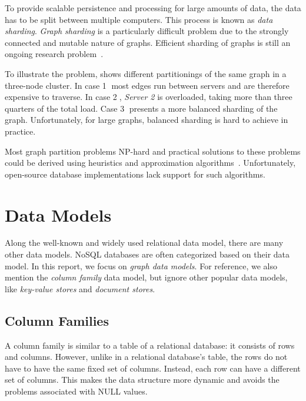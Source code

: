 To provide scalable persistence and processing for large amounts of data, the data has to be split between multiple computers. This process is known as \emph{data sharding}. \emph{Graph sharding} is a particularly difficult problem due to the strongly connected and mutable nature of graphs. Efficient sharding of graphs is still an ongoing research problem~\cite{ShardingGraph}.


To illustrate the problem,  shows different partitionings of the same graph in a three-node cluster. 
In case \textcircled{1} most edges run between servers and are therefore expensive to traverse.
In case \textcircled{2}, \emph{Server 2} is overloaded, taking more than three quarters of the total load.
Case \textcircled{3} presents a more balanced sharding of the graph.
Unfortunately, for large graphs, balanced sharding is hard to achieve in practice.

Most graph partition problems NP-hard and practical solutions to these problems could be derived using heuristics and approximation algorithms~\cite{conf/stacs/FeldmannF12}. Unfortunately, open-source database implementations lack support for such algorithms.

\section{Data Models}

Along the well-known and widely used relational data model, there are many other data models. NoSQL databases are often categorized based on their data model. In this report, we focus on \emph{graph data models}. For reference, we also mention the \emph{column family} data model, but ignore other popular data models, like \emph{key-value stores} and \emph{document stores}.

\subsection{Column Families}

A column family is similar to a table of a relational database: it consists of rows and columns. However, unlike in a relational database's table, the rows do not have to have the same fixed set of columns. Instead, each row can have a different set of columns. This makes the data structure more dynamic and avoids the problems associated with NULL values.

